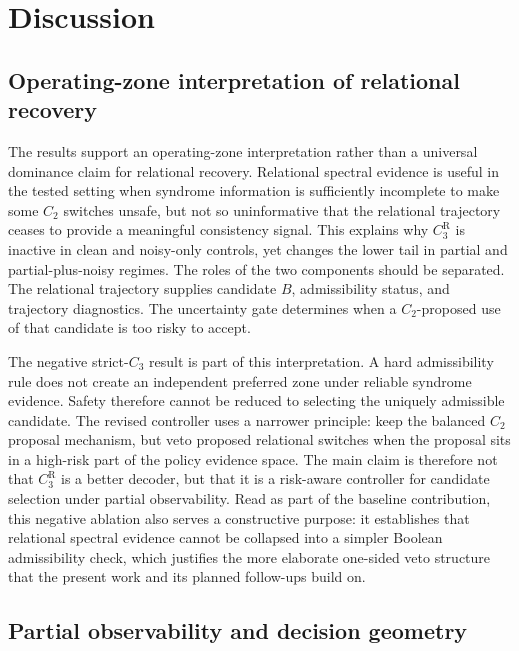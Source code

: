 \documentclass{iopjournal}
\begin{document}
\section{Discussion}\label{sec:discussion}

\subsection{Operating-zone interpretation of relational recovery}
\label{subsec:discussion-operating-zone}

The results support an operating-zone interpretation rather than a universal
dominance claim for relational recovery. Relational spectral evidence is useful in
the tested setting when syndrome information is sufficiently incomplete to make
some $C_2$ switches unsafe, but not so uninformative that the relational
trajectory ceases to provide a meaningful consistency signal. This explains why
$C_3^{\mathrm R}$ is inactive in clean and noisy-only controls, yet changes the
lower tail in partial and partial-plus-noisy regimes.
The roles of the two components should be separated. The relational trajectory
supplies candidate $B$, admissibility status, and trajectory diagnostics. The
uncertainty gate determines when a $C_2$-proposed use of that candidate is too
risky to accept.

The negative strict-$C_3$ result is part of this interpretation. A hard
admissibility rule does not create an independent preferred zone under reliable
syndrome evidence. Safety therefore cannot be reduced to selecting the uniquely
admissible candidate. The revised controller uses a narrower principle: keep the
balanced $C_2$ proposal mechanism, but veto proposed relational switches when the
proposal sits in a high-risk part of the policy evidence space. The main claim is
therefore not that $C_3^{\mathrm R}$ is a better decoder, but that it is a
risk-aware controller for candidate selection under partial observability.
Read as part of the baseline contribution, this negative ablation also serves a 
constructive purpose: it establishes that relational spectral evidence cannot be 
collapsed into a simpler Boolean admissibility check, which justifies the more 
elaborate one-sided veto structure that the present work and its planned 
follow-ups build on.

\subsection{Partial observability and decision geometry}
\label{subsec:discussion-partial-observability}
\end{document}
